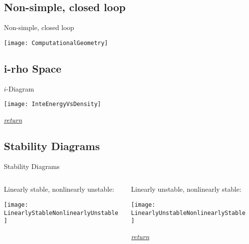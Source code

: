     \subsection*{Non-simple, closed loop}
    \begin{frame}[c,label=NonsimpleClosedLoop]{Non-simple, closed loop}
        \begin{center}
            \texttt{[image: ComputationalGeometry]}
        \end{center}
    \end{frame}
    
    
    \subsection*{i-rho Space}
    \begin{frame}[c,label=irhoSpace]{$i$-\rho Diagram}
        \begin{center}
            \texttt{[image: InteEnergyVsDensity]}
        \end{center}
        \hfill\textit{\tiny\hyperlink{EOS}{return}}
    \end{frame}
    
    
    
    \subsection*{Stability Diagrams}
    \begin{frame}[c,label=StabilityDiagrams]{Stability Diagrams}
        \begin{columns}
            \begin{column}[T]{0.4\textwidth}
                Linearly stable, nonlinearly unstable:
                \begin{center}
                    \vspace{0.09in}
                    \texttt{[image: LinearlyStableNonlinearlyUnstable]}
                \end{center}
            \end{column}
            \hfill
            \begin{column}[T]{0.4\textwidth}
                Linearly unstable, nonlinearly stable:
                \begin{center}
                    \null\vfill
                    \texttt{[image: LinearlyUnstableNonlinearlyStable]}
                    \null\vfill
                \end{center}
                \hfill\textit{\tiny\hyperlink{Perturbation}{return}}
            \end{column}
        \end{columns}
    \end{frame} 
    
